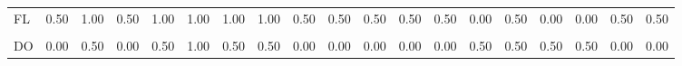 \begin{table}[H]
\begin{tabular}[t]{lrrrrrrrrrrrrrrrrrr}
\addlinespace
FL & 0.50 & 1.00 & 0.50 & 1.00 & 1.00 & 1.00 & 1.00 & 0.50 & 0.50 & 0.50 & 0.50 & 0.50 & 0.00 & 0.50 & 0.00 & 0.00 & 0.50 & 0.50\\
\cellcolor{gray!6}{PE} & \cellcolor{gray!6}{0.00} & \cellcolor{gray!6}{0.33} & \cellcolor{gray!6}{0.00} & \cellcolor{gray!6}{0.33} & \cellcolor{gray!6}{1.00} & \cellcolor{gray!6}{0.33} & \cellcolor{gray!6}{0.33} & \cellcolor{gray!6}{0.33} & \cellcolor{gray!6}{0.33} & \cellcolor{gray!6}{0.33} & \cellcolor{gray!6}{0.33} & \cellcolor{gray!6}{0.33} & \cellcolor{gray!6}{0.67} & \cellcolor{gray!6}{0.67} & \cellcolor{gray!6}{0.67} & \cellcolor{gray!6}{0.67} & \cellcolor{gray!6}{0.00} & \cellcolor{gray!6}{0.33}\\
DO & 0.00 & 0.50 & 0.00 & 0.50 & 1.00 & 0.50 & 0.50 & 0.00 & 0.00 & 0.00 & 0.00 & 0.00 & 0.50 & 0.50 & 0.50 & 0.50 & 0.00 & 0.00\\
\bottomrule
\end{tabular}
\end{table}
